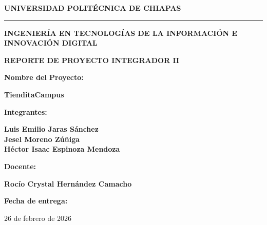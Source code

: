 \documentclass[12pt, a4paper]{article}
\begin{document}
\begin{titlepage}
    \centering
    \vspace*{1cm}
    
    {\Large \textbf{UNIVERSIDAD POLITÉCNICA DE CHIAPAS}}\par
    \vspace{0.5cm}
    \rule{\textwidth}{0.5pt}\par
    \vspace{1cm}
    
    {\large \textbf{INGENIERÍA EN TECNOLOGÍAS DE LA INFORMACIÓN E INNOVACIÓN DIGITAL}}\par
    \vspace{2cm}
    
    {\Large \textbf{REPORTE DE PROYECTO INTEGRADOR II}}\par
    \vspace{1.5cm}
    
    {\large \textbf{Nombre del Proyecto:}}\par
    \vspace{0.3cm}
    {\Large \textbf{TienditaCampus}}\par
    \vspace{1.5cm}
    
    {\large \textbf{Integrantes:}}\par
    \vspace{0.3cm}
    {\normalsize 
    \textbf{Luis Emilio Jaras Sánchez} \\
    \textbf{Jesel Moreno Zúñiga} \\
    \textbf{Héctor Isaac Espinoza Mendoza}
    }\par
    \vspace{1.5cm}
    
    {\large \textbf{Docente:}}\par
    \vspace{0.3cm}
    {\normalsize \textbf{Rocío Crystal Hernández Camacho}}\par
    \vspace{1.5cm}
    
    {\large \textbf{Fecha de entrega:}}\par
    \vspace{0.3cm}
    {\normalsize 26 de febrero de 2026}\par 
    
    \vfill
\end{titlepage}
\end{document}
